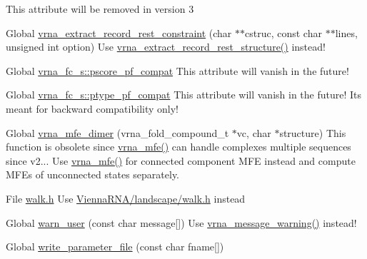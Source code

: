 \begin{DoxyRefList}
%
This attribute will be removed in version 3  
\item[Global \mbox{\hyperlink{group__file__formats_ga55a9ae6dfeecc1b3f0c2acf6fa796c15}{vrna\+\_\+extract\+\_\+record\+\_\+rest\+\_\+constraint}} (char $\ast$$\ast$cstruc, const char $\ast$$\ast$lines, unsigned int option)]\label{deprecated__deprecated000165}%
%
Use \mbox{\hyperlink{group__file__formats_gad37cbb63a05eed63ba25c91628409be0}{vrna\+\_\+extract\+\_\+record\+\_\+rest\+\_\+structure()}} instead!  
\item[Global \mbox{\hyperlink{group__fold__compound_abf5e82d14649b6179ae60ed7da6e4fc0}{vrna\+\_\+fc\+\_\+s\+::pscore\+\_\+pf\+\_\+compat}} ]\label{deprecated__deprecated000079}%
%
This attribute will vanish in the future!  
\item[Global \mbox{\hyperlink{group__fold__compound_a7fe1235ce3d41287695f1ae1e283e8fc}{vrna\+\_\+fc\+\_\+s\+::ptype\+\_\+pf\+\_\+compat}} ]\label{deprecated__deprecated000078}%
%
This attribute will vanish in the future! It\textquotesingle{}s meant for backward compatibility only!  
\item[Global \mbox{\hyperlink{group__mfe__global_gaab22d10c1190f205f16a77cab9d5d3ee}{vrna\+\_\+mfe\+\_\+dimer}} (vrna\+\_\+fold\+\_\+compound\+\_\+t $\ast$vc, char $\ast$structure)]\label{deprecated__deprecated000089}%
%
This function is obsolete since \mbox{\hyperlink{group__mfe__global_gabd3b147371ccf25c577f88bbbaf159fd}{vrna\+\_\+mfe()}} can handle complexes multiple sequences since v2... Use \mbox{\hyperlink{group__mfe__global_gabd3b147371ccf25c577f88bbbaf159fd}{vrna\+\_\+mfe()}} for connected component MFE instead and compute MFEs of unconnected states separately. 
\item[File \mbox{\hyperlink{walk_8h}{walk.h}} ]\label{deprecated__deprecated000142}%
%
Use \mbox{\hyperlink{landscape_2walk_8h}{Vienna\+RNA/landscape/walk.\+h}} instead  
\item[Global \mbox{\hyperlink{utils_2basic_8h_af2355fa8746f2f30fbe71db65dea3d51}{warn\+\_\+user}} (const char message\mbox{[}\mbox{]})]\label{deprecated__deprecated000186}%
%
Use \mbox{\hyperlink{group__message__utils_ga6e07ed24add60693ba886d54d0a46635}{vrna\+\_\+message\+\_\+warning()}} instead!  
\item[Global \mbox{\hyperlink{group__energy__parameters__rw_ga8a43459be386a7489feeab68dc2c6c76}{write\+\_\+parameter\+\_\+file}} (const char fname\mbox{[}\mbox{]})]\label{deprecated__deprecated000154}%

\end{DoxyRefList}
